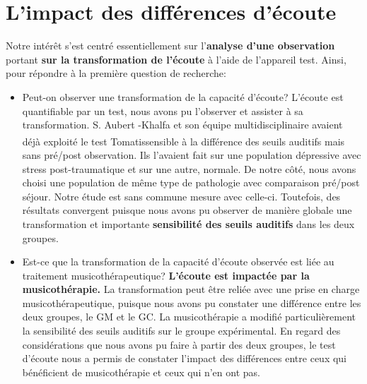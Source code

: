  \section{ L'impact des différences d'écoute }
 Notre intérêt s'est centré essentiellement sur l'\textbf{analyse d'une
 	observation}
 portant \textbf{sur la transformation de l'écoute} à l'aide de
 l'appareil test.
  Ainsi, pour répondre à la première question de recherche: 
  \begin{itemize}
       \item Peut-on observer une transformation de la capacité d'écoute?
          L'écoute est quantifiable  par un test, nous avons pu l'observer et  assister à sa
  transformation. 
  S. Aubert -Khalfa et son équipe multidisciplinaire \autocite{affectiveDisorders} avaient déjà
  exploité le test Tomatis\textsuperscript \textregistered    sensible à la différence des
  seuils auditifs mais sans pré/post observation. Ils l'avaient fait sur une population
  dépressive avec stress post-traumatique et sur une autre, normale. De notre côté, nous avons choisi
  une population de même type de pathologie avec comparaison pré/post séjour.
  Notre étude est sans commune mesure avec celle-ci. Toutefois, 
  des résultats convergent puisque nous avons pu observer de manière globale une transformation et 
  importante 
 \textbf{ sensibilité des seuils auditifs} dans les deux groupes. 
 
 	\item Est-ce que la transformation de la capacité d'écoute observée est liée
 au traitement musicothérapeutique? 
  \textbf{L'écoute est impactée par la musicothérapie.} La transformation peut être reliée  avec
 une prise en charge musicothérapeutique, puisque nous avons pu constater une différence entre les 
 deux groupes, le GM et le GC. 
 La musicothérapie a  modifié particulièrement  la  sensibilité des seuils auditifs sur le groupe 
 expérimental.
 En regard des considérations que nous avons pu faire à partir des deux groupes,
 le test d'écoute nous a permis de constater l'impact des différences  entre ceux qui bénéficient de 
 musicothérapie et ceux qui n'en ont pas.
 

\end{itemize}
